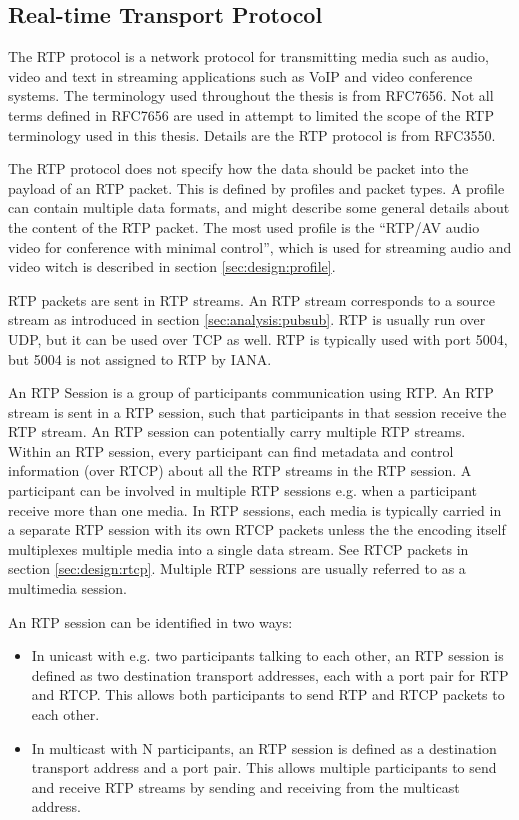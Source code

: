 
\subsection{Real-time Transport Protocol} \label{sec:design:rtp}
The RTP protocol is a network protocol for transmitting media such as audio, video and text in streaming applications such as \ac{VoIP} and video conference systems. The terminology used throughout the thesis is from RFC7656\citep{RFC7656}. Not all terms defined in RFC7656 are used in attempt to limited the scope of the RTP terminology used in this thesis. Details are the RTP protocol is from RFC3550\citep{RFC3550}.

The RTP protocol does not specify how the data should be packet into the payload of an RTP packet. This is defined by profiles and packet types. A profile can contain multiple data formats, and might describe some general details about the content of the RTP packet.
The most used profile is the ``RTP/AV audio video for conference with minimal control'', which is used for streaming audio and video witch is described in section \ref{sec:design:profile}.

 \label{sec:design:rtpstream}
RTP packets are sent in RTP streams. An RTP stream corresponds to a source stream as introduced in section \ref{sec:analysis:pubsub}. RTP is usually run over UDP, but it can be used over TCP as well. RTP is typically used with port 5004, but 5004 is not assigned to RTP by IANA\citep{iana_ports}.


 \label{sec:design:rtpsession}
An RTP Session is a group of participants communication using RTP.
An RTP stream is sent in a RTP session, such that participants in that session receive the RTP stream. An RTP session can potentially carry multiple RTP streams. Within an RTP session, every participant can find metadata and control information (over RTCP) about all the RTP streams in the RTP session. A participant can be involved in multiple RTP sessions e.g. when a participant receive more than one media. In RTP sessions, each media is typically carried in a separate RTP session with its own RTCP packets unless the the encoding itself multiplexes multiple media into a single data stream. See RTCP packets in section \ref{sec:design:rtcp}. Multiple RTP sessions are usually referred to as a multimedia session.


An RTP session can be identified in two ways:
\begin{itemize}
	\item In unicast with e.g. two participants talking to each other, an RTP session is defined as two destination transport addresses, each with a port pair for RTP and RTCP. This allows both participants to send RTP and RTCP packets to each other.
	\item In multicast with N participants, an RTP session is defined as a destination transport address and a port pair. This allows multiple participants to send and receive RTP streams by sending and receiving from the multicast address.
\end{itemize}

